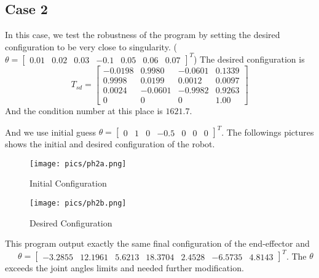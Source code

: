 \documentclass[english,10pt,a4paper]{book}
\begin{document}
    \subsection*{Case 2}
    In this case, we test the robustness of the program by setting the desired configuration to be very close to singularity. (\(\theta = \begin{bmatrix}
        0.01 & 0.02 & 0.03 & -0.1 & 0.05 & 0.06 & 0.07 \end{bmatrix}^T\)) The desired configuration is
    \begin{equation}
        T_{sd} = \begin{bmatrix}
            -0.0198 & 0.9980 & -0.0601 & 0.1339\\
            0.9998 & 0.0199 & 0.0012 & 0.0097\\
            0.0024 & -0.0601 & -0.9982 & 0.9263\\
            0 & 0 & 0 & 1.00
        \end{bmatrix}
    \end{equation}
    And the condition number at this place is \(1621.7\).
    
    And we use initial guess \(\theta = \begin{bmatrix}
        0 & 1 & 0 & -0.5 & 0 & 0 & 0 \end{bmatrix}^T\). The followings pictures shows the initial and desired configuration of the robot.
    \begin{figure}[H]
        \centering
        \begin{minipage}{0.45\textwidth}
            \centering
            \texttt{[image: pics/ph2a.png]} %
            \caption{Initial Configuration}
            \label{fig:ph2a}
        \end{minipage}
        \hfill
        \begin{minipage}{0.45\textwidth}
        \centering
            \texttt{[image: pics/ph2b.png]} %
            \caption{Desired Configuration}
            \label{fig:ph2b}
        \end{minipage}
    \end{figure}
    This program output exactly the same final configuration of the end-effector and \ \ \ \(\theta = \begin{bmatrix} -3.2855 & 12.1961 & 5.6213 & 18.3704 & 2.4528 & -6.5735 & 4.8143 \end{bmatrix}^T\). The \(\theta\) exceeds the joint angles limits and needed further modification.
\end{document}
